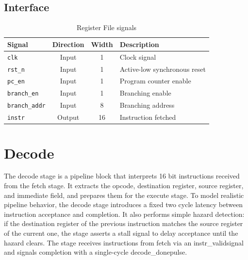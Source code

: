\subsection{Interface}

\begin{table}[h!]
    \centering
    \begin{tabular}{|l|c|c|l|}
        \hline
        \textbf{Signal}         & \textbf{Direction} & \textbf{Width} & \textbf{Description}            \\ \hline
        \texttt{clk}            & Input              & 1              & Clock signal                    \\ \hline
        \texttt{rst\_n}         & Input              & 1              & Active-low synchronous reset    \\ \hline
        \texttt{pc\_en}         & Input              & 1              & Program counter enable          \\ \hline
        \texttt{branch\_en}     & Input              & 1              & Branching enable                \\ \hline
        \texttt{branch\_addr}   & Input              & 8              & Branching address               \\ \hline
        \texttt{instr}          & Output             & 16             & Instruction fetched             \\ \hline
    \end{tabular}
    \caption{Register File signals}

\end{table}

\section{Decode}

The decode stage is a pipeline block that interprets 16 bit instructions received from the fetch stage.
It extracts the opcode, destination register, source register, and immediate field, and prepares them for the execute stage.
To model realistic pipeline behavior, the decode stage introduces a fixed two cycle latency between instruction acceptance and completion.
It also performs simple hazard detection: if the destination register of the previous instruction matches the source register of the current one, the stage asserts a stall signal to delay acceptance until the hazard clears.
The stage receives instructions from fetch via an instr\_validsignal and signals completion with a single-cycle decode\_donepulse.

